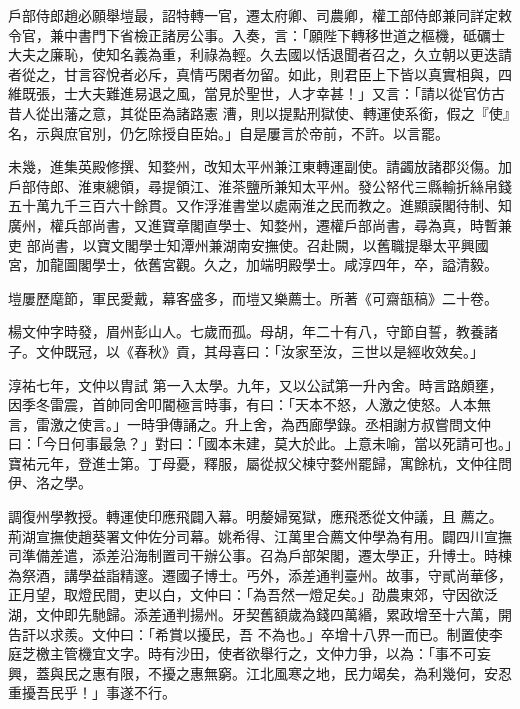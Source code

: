 \begin{pinyinscope}
 戶部侍郎趙必願舉塏最，詔特轉一官，遷太府卿、司農卿，權工部侍郎兼同詳定敕令官，兼中書門下省檢正諸房公事。入奏，言：「願陛下轉移世道之樞機，砥礪士大夫之廉恥，使知名義為重，利祿為輕。久去國以恬退聞者召之，久立朝以更迭請者從之，甘言容悅者必斥，真情丐閑者勿留。如此，則君臣上下皆以真實相與，四維既張，士大夫難進易退之風，當見於聖世，人才幸甚！」又言：「請以從官仿古昔人從出藩之意，其從臣為諸路憲
 漕，則以提點刑獄使、轉運使系銜，假之『使』名，示與庶官別，仍乞除授自臣始。」自是屢言於帝前，不許。以言罷。



 未幾，進集英殿修撰、知婺州，改知太平州兼江東轉運副使。請蠲放諸郡災傷。加戶部侍郎、淮東總領，尋提領江、淮茶鹽所兼知太平州。發公帑代三縣輸折絲帛錢五十萬九千三百六十餘貫。又作浮淮書堂以處兩淮之民而教之。進顯謨閣待制、知廣州，權兵部尚書，又進寶章閣直學士、知婺州，遷權戶部尚書，尋為真，時暫兼吏
 部尚書，以寶文閣學士知潭州兼湖南安撫使。召赴闕，以舊職提舉太平興國宮，加龍圖閣學士，依舊宮觀。久之，加端明殿學士。咸淳四年，卒，謚清毅。



 塏屢歷麾節，軍民愛戴，幕客盛多，而塏又樂薦士。所著《可齋瓿稿》二十卷。



 楊文仲字時發，眉州彭山人。七歲而孤。母胡，年二十有八，守節自誓，教養諸子。文仲既冠，以《春秋》貢，其母喜曰：「汝家至汝，三世以是經收效矣。」



 淳祐七年，文仲以胄試
 第一入太學。九年，又以公試第一升內舍。時言路頗壅，因季冬雷震，首帥同舍叩閽極言時事，有曰：「天本不怒，人激之使怒。人本無言，雷激之使言。」一時爭傳誦之。升上舍，為西廊學錄。丞相謝方叔嘗問文仲曰：「今日何事最急？」對曰：「國本未建，莫大於此。上意未喻，當以死請可也。」寶祐元年，登進士第。丁母憂，釋服，屬從叔父棟守婺州罷歸，寓餘杭，文仲往問伊、洛之學。



 調復州學教授。轉運使印應飛闢入幕。明嫠婦冤獄，應飛悉從文仲議，且
 薦之。荊湖宣撫使趙葵署文仲佐分司幕。姚希得、江萬里合薦文仲學為有用。闢四川宣撫司準備差遣，添差沿海制置司干辦公事。召為戶部架閣，遷太學正，升博士。時棟為祭酒，講學益詣精邃。遷國子博士。丐外，添差通判臺州。故事，守貳尚華侈，正月望，取燈民間，吏以白，文仲曰：「為吾然一燈足矣。」劭農東郊，守因欲泛湖，文仲即先馳歸。添差通判揚州。牙契舊額歲為錢四萬緡，累政增至十六萬，開告訐以求羨。文仲曰：「希賞以擾民，吾
 不為也。」卒增十八界一而已。制置使李庭芝檄主管機宜文字。時有沙田，使者欲舉行之，文仲力爭，以為：「事不可妄興，蓋與民之惠有限，不擾之惠無窮。江北風寒之地，民力竭矣，為利幾何，安忍重擾吾民乎！」事遂不行。




\end{pinyinscope}

